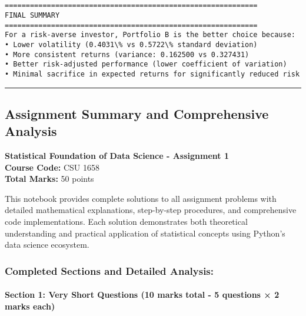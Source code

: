 \documentclass[11pt]{article}
\begin{document}
    \begin{center}
    \end{center}
    { \hspace*{\fill} \\}
    
    \begin{Verbatim}[commandchars=\\\{\}]

============================================================
FINAL SUMMARY
============================================================
For a risk-averse investor, Portfolio B is the better choice because:
• Lower volatility (0.4031\% vs 0.5722\% standard deviation)
• More consistent returns (variance: 0.162500 vs 0.327431)
• Better risk-adjusted performance (lower coefficient of variation)
• Minimal sacrifice in expected returns for significantly reduced risk
    \end{Verbatim}

    \begin{center}\rule{0.5\linewidth}{0.5pt}\end{center}

\subsection{Assignment Summary and Comprehensive
Analysis}\label{assignment-summary-and-comprehensive-analysis}

\textbf{Statistical Foundation of Data Science - Assignment 1}\\
\textbf{Course Code:} CSU 1658\\
\textbf{Total Marks:} 50 points

This notebook provides complete solutions to all assignment problems
with detailed mathematical explanations, step-by-step procedures, and
comprehensive code implementations. Each solution demonstrates both
theoretical understanding and practical application of statistical
concepts using Python's data science ecosystem.

\subsubsection{Completed Sections and Detailed
Analysis:}\label{completed-sections-and-detailed-analysis}

\paragraph{\texorpdfstring{\textbf{Section 1: Very Short Questions (10
marks total - 5 questions × 2 marks
each)}}{Section 1: Very Short Questions (10 marks total - 5 questions × 2 marks each)}}\label{section-1-very-short-questions-10-marks-total---5-questions-2-marks-each}
\end{document}
